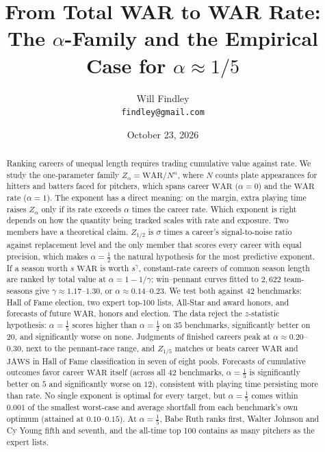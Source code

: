 \documentclass[11pt,letterpaper]{article}
\title{\textbf{From Total WAR to WAR Rate:\\
The $\alpha$-Family and the Empirical Case for $\alpha \approx 1/5$}}
\author{
  Will Findley\\
  \texttt{findley@gmail.com}
}
\date{October 23, 2026}
\theoremstyle{plain}
\theoremstyle{definition}
\theoremstyle{remark}
\newcommand{\WAR}{\mathrm{WAR}}
\newcommand{\JAWS}{\mathrm{JAWS}}
\begin{document}
\maketitle

\begin{abstract}
\noindent
Ranking careers of unequal length requires trading cumulative value against rate. We study the one-parameter family $Z_\alpha = \WAR/N^{\alpha}$, where $N$ counts plate appearances for hitters and batters faced for pitchers, which spans career $\WAR$ ($\alpha = 0$) and the $\WAR$ rate ($\alpha = 1$). The exponent has a direct meaning: on the margin, extra playing time raises $Z_\alpha$ only if its rate exceeds $\alpha$ times the career rate. Which exponent is right depends on how the quantity being tracked scales with rate and exposure. Two members have a theoretical claim. $Z_{1/2}$ is $\sigma$ times a career's signal-to-noise ratio against replacement level and the only member that scores every career with equal precision, which makes $\alpha = \tfrac12$ the natural hypothesis for the most predictive exponent. If a season worth $s$ $\WAR$ is worth $s^{\gamma}$, constant-rate careers of common season length are ranked by total value at $\alpha = 1 - 1/\gamma$; win--pennant curves fitted to $2{,}622$ team-seasons give $\gamma \approx 1.17$--$1.30$, or $\alpha \approx 0.14$--$0.23$. We test both against $42$ benchmarks: Hall of Fame election, two expert top-100 lists, All-Star and award honors, and forecasts of future $\WAR$, honors and election. The data reject the $z$-statistic hypothesis: $\alpha = \tfrac15$ scores higher than $\alpha = \tfrac12$ on $35$ benchmarks, significantly better on $20$, and significantly worse on none. Judgments of finished careers peak at $\alpha \approx 0.20$--$0.30$, next to the pennant-race range, and $Z_{1/5}$ matches or beats career $\WAR$ and $\JAWS$ in Hall of Fame classification in seven of eight pools. Forecasts of cumulative outcomes favor career $\WAR$ itself (across all $42$ benchmarks, $\alpha = \tfrac15$ is significantly better on $5$ and significantly worse on $12$), consistent with playing time persisting more than rate. No single exponent is optimal for every target, but $\alpha = \tfrac15$ comes within $0.001$ of the smallest worst-case and average shortfall from each benchmark's own optimum (attained at $0.10$--$0.15$). At $\alpha = \tfrac15$, Babe Ruth ranks first, Walter Johnson and Cy Young fifth and seventh, and the all-time top 100 contains as many pitchers as the expert lists.
\end{abstract}
\end{document}
